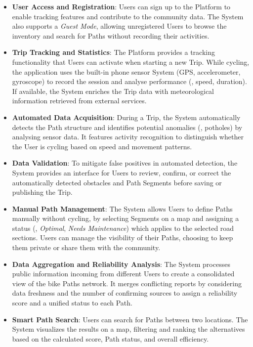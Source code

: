 \begin{itemize}
    \item \textbf{User Access and Registration}: Users can sign up to the Platform to enable tracking features and contribute to the community data. The System also supports a \emph{Guest Mode}, allowing unregistered Users to browse the inventory and search for Paths without recording their activities.
    
    \item \textbf{Trip Tracking and Statistics}: The Platform provides a tracking functionality that Users can activate when starting a new Trip. While cycling, the application uses the built-in phone sensor System (GPS, accelerometer, gyroscope) to record the session and analyse performance (\eg, speed, duration). If available, the System enriches the Trip data with meteorological information retrieved from external services.
    
    \item \textbf{Automated Data Acquisition}: During a Trip, the System automatically detects the Path structure and identifies potential anomalies (\eg, potholes) by analysing sensor data. It features activity recognition to distinguish whether the User is cycling based on speed and movement patterns.
    
    \item \textbf{Data Validation}: To mitigate false positives in automated detection, the System provides an interface for Users to review, confirm, or correct the automatically detected obstacles and Path Segments before saving or publishing the Trip.
    
    \item \textbf{Manual Path Management}: The System allows Users to define Paths manually without cycling, by selecting Segments on a map and assigning a status (\eg, \emph{Optimal}, \emph{Needs Maintenance}) which applies to the selected road sections. Users can manage the visibility of their Paths, choosing to keep them private or share them with the community.
    
    \item \textbf{Data Aggregation and Reliability Analysis}: The System processes public information incoming from different Users to create a consolidated view of the bike Paths network. It merges conflicting reports by considering data freshness and the number of confirming sources to assign a reliability score and a unified status to each Path.
    
    \item \textbf{Smart Path Search}: Users can search for Paths between two locations. The System visualizes the results on a map, filtering and ranking the alternatives based on the calculated score, Path status, and overall efficiency.
\end{itemize}

